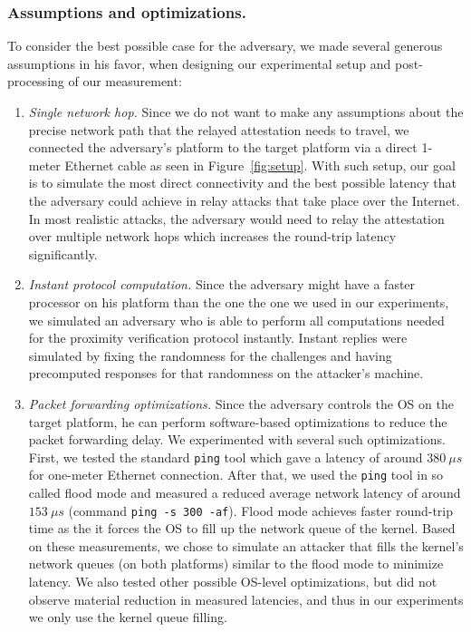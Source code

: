 \subsubsection{Assumptions and optimizations.}
To consider the best possible case for the adversary, we made several generous assumptions in his favor, when designing our experimental setup and post-processing of our measurement:

\begin{enumerate}
	\item \emph{Single network hop.} Since we do not want to make any assumptions about the precise network path that the relayed attestation needs to travel, we connected the adversary's platform to the target platform via a direct 1-meter Ethernet cable as seen in Figure~\ref{fig:setup}. With such setup, our goal is to simulate the most direct connectivity and the best possible latency that the adversary could achieve in relay attacks that take place over the Internet. In most realistic attacks, the adversary would need to relay the attestation over multiple network hops which increases the round-trip latency significantly. 

	\item \emph{Instant protocol computation.} Since the adversary might have a faster processor on his platform than the one the one we used in our experiments, we simulated an adversary who is able to perform all computations needed for the proximity verification protocol instantly. Instant replies were simulated by fixing the randomness for the challenges and having precomputed responses for that randomness on the attacker's machine.

	\item \emph{Packet forwarding optimizations.} Since the adversary controls the OS on the target platform, he can perform software-based optimizations to reduce the packet forwarding delay. We experimented with several such optimizations. First, we tested the standard \texttt{ping} tool which gave a latency of around $380\ \mu s$ for one-meter Ethernet connection. After that, we used the \texttt{ping} tool in so called flood mode and measured a reduced average network latency of around $153\ \mu s$ (command \texttt{ping -s 300 -af}). Flood mode achieves faster round-trip time as the it forces the OS to fill up the network queue of the kernel. Based on these measurements, we chose to simulate an attacker that fills the kernel's network queues (on both platforms) similar to the flood mode to minimize latency. We also tested other possible OS-level optimizations, but did not observe material reduction in measured latencies, and thus in our experiments we only use the kernel queue filling.
	

\end{enumerate}
